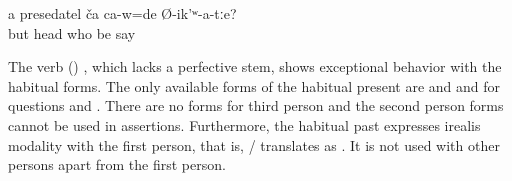  
\begin{exe}
	
	\ex	\label{ex:Who did you say was the head}
	\gll	a	presedatel	ča 	ca-w=de	Ø-ik'ʷ-a-tːe?\\
		but	head	who	be	say\\
	\glt	{}
\end{exe}

The verb  () , which lacks a perfective stem, shows exceptional behavior with the habitual forms. The only available forms of the habitual present are   and   and for questions   and  . There are no forms for third person and the second person forms cannot be used in assertions. Furthermore, the habitual past expresses irealis modality with the first person, that is, \slash{} translates as . It is not used with other persons apart from the first person.



